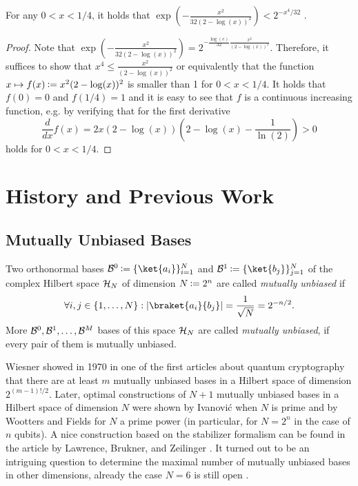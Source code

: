 \begin{lemma} \label{lem:epsilon}
 For any $0 < x < 1/4$, it holds that $\exp(-\frac{x^2 }{32
 (2-\log(x))^2}) < 2^{-x^4/32}$ .
\end{lemma}
\begin{proof}
  Note that $\exp(-\frac{x^2 }{32(2-\log(x))^2}) = 2^{-
    \frac{\log(e)}{32} \frac{x^2}{(2-\log(x))^2}}$. Therefore, it
  suffices to show that $x^4 \leq \frac{x^2}{(2-\log(x))^2}$ or
  equivalently that the function $x \mapsto f(x) \assign x^2
  (2-\log(x))^2$ is smaller than 1 for $0<x<1/4$. It holds that
  $f(0)=0$ and $f(1/4)=1$ and it is easy to see that $f$ is a
  continuous increasing function, e.g. by verifying that for the first
  derivative
\[ \frac{d}{dx}f(x)=2x \left(2-\log(x) \right) \left(2-\log(x) - \frac{1}{\ln(2)} \right) 
    >0  \] holds for $0<x<1/4$.
\end{proof}

\section{History and Previous Work} \label{sec:uncerthistory}
\subsection{Mutually Unbiased Bases}
\begin{definition}
Two orthonormal bases $\Ba{0} \assign \set{\ket{a_i}}_{i=1}^N$ and $\Ba{1}
  \assign \set{\ket{b_j}}_{j=1}^N$ of the complex Hilbert space
  $\mathcal{H}_N$ of dimension $N\assign 2^n$ are called \emph{mutually unbiased} if
\[ \forall i, j \in \set{1, \ldots, N} : \left|
  \braket{a_i}{b_j} \right| = \frac{1}{\sqrt{N}}=2^{-n/2}.
\]
More $\mathcal{B}^{0}, \mathcal{B}^{1}, \ldots, \mathcal{B}^{M}$ bases of this space
$\mathcal{H}_N$ are called \emph{mutually unbiased}, if every pair of
them is mutually unbiased.
\end{definition}

Wiesner showed in 1970 in one of the first articles about quantum
cryptography \cite{Wiesner83} that there are at least $m$ mutually
unbiased bases in a Hilbert space of dimension $2^{(m-1)!/2}$. Later,
optimal constructions of $N+1$ mutually unbiased bases in a Hilbert
space of dimension $N$ were shown by Ivanovi\'c when $N$ is prime
\cite{Ivanovic81} and by Wootters and Fields for $N$ a prime power
\cite{WF89} (in particular, for $N=2^n$ in the case of $n$ qubits). A
nice construction based on the stabilizer
formalism can be found in
the article by Lawrence, Brukner, and Zeilinger \cite{LBZ02}. It
turned out to be an intriguing question to determine the maximal
number of mutually unbiased bases in other dimensions, already the
case $N=6$ is still open \cite{Englert03}.

